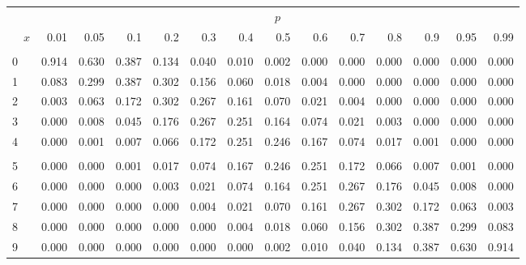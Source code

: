 \documentclass[
]{article}
\begin{document}
\begin{table}[H]
\centering
\begin{tabular}{lrrrrrrrrrrrrr}
\toprule
\multicolumn{1}{c}{ } & \multicolumn{13}{c}{$p$} \\
\cmidrule(l{3pt}r{3pt}){2-14}
$\hspace{1em}x$ & 0.01 & 0.05 & 0.1 & 0.2 & 0.3 & 0.4 & 0.5 & 0.6 & 0.7 & 0.8 & 0.9 & 0.95 & 0.99\\
\midrule
\addlinespace[0.3em]
\multicolumn{14}{l}{$n=9$}\\
\hspace{1em}0 & 0.914 & 0.630 & 0.387 & 0.134 & 0.040 & 0.010 & 0.002 & 0.000 & 0.000 & 0.000 & 0.000 & 0.000 & 0.000\\
\hspace{1em}1 & 0.083 & 0.299 & 0.387 & 0.302 & 0.156 & 0.060 & 0.018 & 0.004 & 0.000 & 0.000 & 0.000 & 0.000 & 0.000\\
\hspace{1em}2 & 0.003 & 0.063 & 0.172 & 0.302 & 0.267 & 0.161 & 0.070 & 0.021 & 0.004 & 0.000 & 0.000 & 0.000 & 0.000\\
\hspace{1em}3 & 0.000 & 0.008 & 0.045 & 0.176 & 0.267 & 0.251 & 0.164 & 0.074 & 0.021 & 0.003 & 0.000 & 0.000 & 0.000\\
\hspace{1em}4 & 0.000 & 0.001 & 0.007 & 0.066 & 0.172 & 0.251 & 0.246 & 0.167 & 0.074 & 0.017 & 0.001 & 0.000 & 0.000\\
\addlinespace[-.7em]
\multicolumn{14}{l}{ }\\
\hspace{1em}5 & 0.000 & 0.000 & 0.001 & 0.017 & 0.074 & 0.167 & 0.246 & 0.251 & 0.172 & 0.066 & 0.007 & 0.001 & 0.000\\
\hspace{1em}6 & 0.000 & 0.000 & 0.000 & 0.003 & 0.021 & 0.074 & 0.164 & 0.251 & 0.267 & 0.176 & 0.045 & 0.008 & 0.000\\
\hspace{1em}7 & 0.000 & 0.000 & 0.000 & 0.000 & 0.004 & 0.021 & 0.070 & 0.161 & 0.267 & 0.302 & 0.172 & 0.063 & 0.003\\
\hspace{1em}8 & 0.000 & 0.000 & 0.000 & 0.000 & 0.000 & 0.004 & 0.018 & 0.060 & 0.156 & 0.302 & 0.387 & 0.299 & 0.083\\
\hspace{1em}9 & 0.000 & 0.000 & 0.000 & 0.000 & 0.000 & 0.000 & 0.002 & 0.010 & 0.040 & 0.134 & 0.387 & 0.630 & 0.914\\

\end{tabular}
\end{table}
\end{document}
